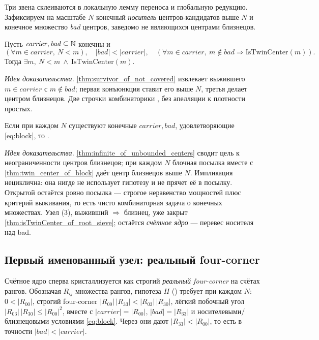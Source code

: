 Три звена склеиваются в локальную лемму переноса и глобальную редукцию. Зафиксируем на масштабе $N$
конечный \emph{носитель} центров-кандидатов выше $N$ и конечное множество \emph{bad} центров,
заведомо не являющихся центрами близнецов.

\begin{theorem}\label{thm:twin_center_of_block}
Пусть $\mathit{carrier},\mathit{bad}\subseteq\mathbb{N}$ конечны и
\begin{equation}\label{eq:block}
  (\forall m\in\mathit{carrier},\ N<m),\quad |\mathit{bad}|<|\mathit{carrier}|,\quad
  (\forall m\in\mathit{carrier},\ m\notin\mathit{bad}\Rightarrow\mathrm{IsTwinCenter}(m)).
\end{equation}
Тогда $\exists m,\ N<m\ \wedge\ \mathrm{IsTwinCenter}(m)$.
\end{theorem}

\emph{Идея доказательства.} \cref{thm:survivor_of_not_covered} извлекает выжившего
$m\in\mathit{carrier}$ с $m\notin\mathit{bad}$; первая конъюнкция ставит его выше $N$, третья делает
центром близнецов. Две строчки комбинаторики , без апелляции к плотности простых.
\green{}

\begin{theorem}\label{thm:twin_prime_conjecture_of_blocks}
Если при каждом $N$ существуют конечные $\mathit{carrier},\mathit{bad}$, удовлетворяющие
\cref{eq:block}, то .
\end{theorem}

\emph{Идея доказательства.} \cref{thm:infinite_of_unbounded_centers} сводит цель к неограниченности
центров близнецов; при каждом $N$ блочная посылка вместе с \cref{thm:twin_center_of_block} даёт
центр близнецов выше $N$. \green{} Импликация нециклична: она нигде не использует гипотезу и не
прячет её в посылку. Открытой остаётся ровно посылка --- строгое неравенство мощностей плюс критерий
выживания, то есть чисто комбинаторная задача о конечных множествах. Узел (3), выживший
$\Rightarrow$ близнец, уже закрыт \cref{thm:isTwinCenter_of_root_sieve}; остаётся \emph{счётное
ядро} --- перевес носителя над bad.

\subsection{Первый именованный узел: реальный four-corner}

Счётное ядро сперва кристаллизуется как строгий \emph{реальный four-corner} на счётах рангов.
Обозначая $R_{ij}$ множества рангов, гипотеза $H$ () требует при каждом $N$:
$0<|R_{00}|$, строгий four-corner $|R_{00}|\,|R_{33}|<|R_{03}|\,|R_{30}|$, лёгкий побочный угол
$|R_{03}|\,|R_{30}|\le|R_{00}|^2$, вместе с $|\mathit{carrier}|=|R_{00}|$,
$|\mathit{bad}|=|R_{33}|$ и носителевыми/близнецовыми условиями \cref{eq:block}. Через
 они дают $|R_{33}|<|R_{00}|$, то есть в точности
$|\mathit{bad}|<|\mathit{carrier}|$.


